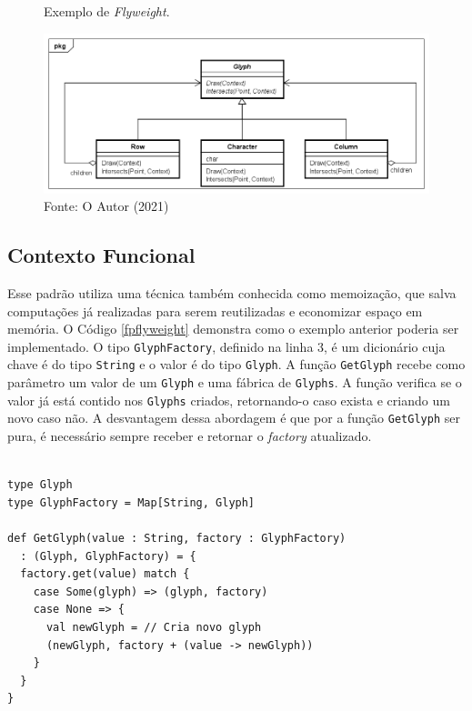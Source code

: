 \begin{figure}[htb]
	\caption{\label{flyweight_exemplo}Exemplo de \textit{Flyweight}.}
	\begin{center}
	    \includegraphics[scale=0.5]{5_padroes-contexto-funcional/5.2_estruturais/5.2.6_flyweight/flyweight_exemplo.png}
	\end{center}
  \caption*{Fonte: O Autor (2021)}
\end{figure}

\subsection*{Contexto Funcional}

Esse padrão utiliza uma técnica também conhecida 
como memoização, que salva computações já realizadas 
para serem reutilizadas e economizar espaço em 
memória\cite{scalafunctpatterns}. O Código \ref{fpflyweight} 
demonstra como o exemplo anterior poderia ser 
implementado. O tipo \texttt{GlyphFactory}, definido na 
linha 3, é um dicionário cuja chave é do tipo 
\texttt{String} e o valor é do tipo \texttt{Glyph}. A função 
\texttt{GetGlyph} recebe como parâmetro um valor de um 
\texttt{Glyph} e uma fábrica de \texttt{Glyphs}. A função verifica 
se o valor já está contido nos \texttt{Glyphs} criados, 
retornando-o caso exista e criando um novo 
caso não. A desvantagem dessa abordagem é que 
por a função \texttt{GetGlyph} ser pura, é necessário 
sempre receber e retornar o \textit{factory} 
atualizado.

\begin{lstlisting}[caption={\textit{Flyweight} Funcional.},label=fpflyweight]
    
type Glyph
type GlyphFactory = Map[String, Glyph]

def GetGlyph(value : String, factory : GlyphFactory)
  : (Glyph, GlyphFactory) = {
  factory.get(value) match {
    case Some(glyph) => (glyph, factory)
    case None => {
      val newGlyph = // Cria novo glyph 
      (newGlyph, factory + (value -> newGlyph))
    }
  }
}
    
\end{lstlisting}
